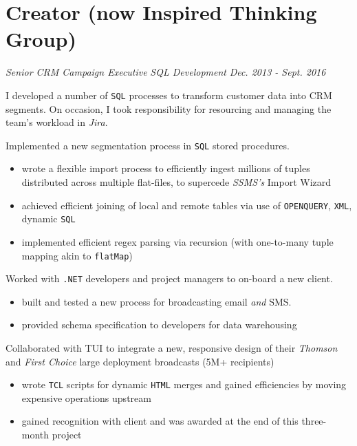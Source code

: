 \documentclass[letterpaper,11pt]{article}
\begin{document}
\section{Creator (now Inspired Thinking Group)}
\textit{Senior CRM Campaign Executive}
\hfill
\textit{SQL Development}
\hfill
\textit{Dec. 2013 - Sept. 2016}
\begin{paragraph}
	I developed a number of \texttt{SQL} processes to transform customer data into CRM segments.  On occasion, I took responsibility for resourcing and managing the team's workload in \textit{Jira}.
\end{paragraph}
\begin{description}[style=multiline,leftmargin=3cm]
	\item[Virgin Media Segmentation \tiny\textnormal{\href{https://adrian.ng/SQL/recursion}{adrian.ng/SQL/recursion}} \textnormal{\href{https://adrian.ng/openquery-xml}{adrian.ng/openquery-xml}}]
	      Implemented a new segmentation process in \texttt{SQL} stored procedures.
	      \begin{itemize}
		      \item wrote a flexible import process to efficiently ingest millions of tuples distributed across multiple flat-files, to supercede \textit{SSMS's} Import Wizard
		      \item achieved efficient joining of local and remote tables via use of \texttt{OPENQUERY}, \texttt{XML}, dynamic \texttt{SQL}
		      \item implemented efficient regex parsing via recursion (with one-to-many tuple mapping akin to \texttt{flatMap})
	      \end{itemize}
	\item[Volkswagen Onboarding]
	      Worked with \texttt{.NET} developers and project managers to on-board a new client.
	      \begin{itemize}
		      \item built and tested a new process for broadcasting email \textit{and} SMS.
		      \item provided schema specification to developers for data warehousing
	      \end{itemize}
	\item[TUI Redesign]
	      Collaborated with TUI to integrate a new, responsive design of their \textit{Thomson} and \textit{First Choice} large deployment broadcasts (5M+ recipients)
	      \begin{itemize}
		      \item wrote \texttt{TCL} scripts for dynamic \texttt{HTML} merges and gained efficiencies by moving expensive operations upstream
		      \item gained recognition with client and was awarded at the end of this three-month project
	      \end{itemize}
\end{description}
\end{document}
